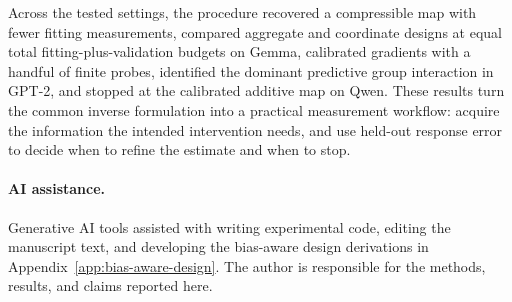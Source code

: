 \documentclass[sigconf,10pt,nonacm,balance=false]{acmart}
\begin{document}
Across the tested settings, the procedure recovered a compressible map with fewer fitting measurements, compared aggregate and coordinate designs at equal total fitting-plus-validation budgets on Gemma, calibrated gradients with a handful of finite probes, identified the dominant predictive group interaction in GPT-2, and stopped at the calibrated additive map on Qwen. These results turn the common inverse formulation into a practical measurement workflow: acquire the information the intended intervention needs, and use held-out response error to decide when to refine the estimate and when to stop.

\paragraph{AI assistance.}
Generative AI tools assisted with writing experimental code, editing the manuscript text, and developing the bias-aware design derivations in Appendix~\ref{app:bias-aware-design}. The author is responsible for the methods, results, and claims reported here.
\end{document}
